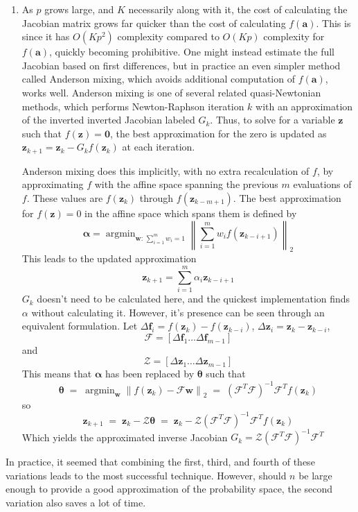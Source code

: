 \documentclass[11pt]{article}
\theoremstyle{definition}
\DeclareMathOperator*{\argmin}{arg\min}
\begin{document}
\begin{enumerate}
            \item As $p$ grows large, and $K$ necessarily along with it, the cost of calculating the Jacobian matrix grows far quicker than the cost of calculating $f(\mathbf a)$. This is since it has $O(Kp^2)$ complexity compared to $O(Kp)$ complexity for $f(\mathbf a)$, quickly becoming prohibitive. One might instead estimate the full Jacobian based on first differences, but in practice an even simpler method called Anderson mixing, which avoids additional computation of $f(\mathbf a)$, works well. Anderson mixing is one of several related quasi-Newtonian methods, which performs Newton-Raphson iteration $k$ with an approximation of the inverted inverted Jacobian labeled $G_k$. Thus, to solve for a variable $\mathbf z$ such that $f(\mathbf z)=\mathbf 0$, the best approximation for the zero is updated as $\mathbf z_{k+1}=\mathbf z_k - G_k f(\mathbf{z}_k)$ at each iteration. \par
    Anderson mixing does this implicitly, with no extra recalculation of $f$, by approximating $f$ with the affine space spanning the previous $m$ evaluations of $f$. These values are $f(\mathbf z_{k})$ through $f(\mathbf z_{k-m+1})$. The best approximation for $f(\mathbf z)=0$ in the affine space which spans them is defined by
    \[ \mathbf \alpha = \argmin_{\mathbf w:\, \sum_{i=1}^m w_i=1} \left\|\sum_{i=1}^m  w_i f(\mathbf z_{k-i+1}) \right\|_2 \]
    This leads to the updated approximation
    \[ \mathbf z_{k+1} = \sum_{i=1}^{m} \alpha_{i} \mathbf z_{k-i+1} \]
    $G_k$ doesn't need to be calculated here, and the quickest implementation finds $\alpha$ without calculating it. However, it's presence can be seen through an equivalent formulation. Let $\Delta \mathbf f_i = f(\mathbf z_k) - f(\mathbf z_{k-i})$, $\Delta \mathbf z_i = \mathbf z_k - \mathbf z_{k-i}$, 
    \[ \mathcal F = [\Delta \mathbf f_1 \ldots \Delta \mathbf f_{m-1}] \]
    and
    \[ \mathcal Z = [\Delta \mathbf z_1 \ldots \Delta \mathbf z_{m-1}] \]
    This means that $\mathbf\alpha$ has been replaced by $\mathbf\theta$ such that
    \[ \mathbf \theta \; = \;\argmin_{\mathbf w} \left\|f(\mathbf z_{k}) - \mathcal  F \mathbf w\right\|_2\; = \;(\mathcal F^T \mathcal F)^{-1}\mathcal F^Tf(\mathbf z_k) \]
    so 
    \[ \mathbf z_{k+1} \;= \;\mathbf z_{k} - \mathcal Z \mathbf \theta\; = \; \mathbf z_{k} - \mathcal Z(\mathcal F^T \mathcal F)^{-1}\mathcal F^T f(\mathbf z_k) \]
    Which yields the approximated inverse Jacobian $G_k= \mathcal Z(\mathcal F^T \mathcal F)^{-1}\mathcal F^T$
        \end{enumerate}
        In practice, it seemed that combining the first, third, and fourth of these variations leads to the most successful technique. However, should $n$ be large enough to provide a good approximation of the probability space, the second variation also saves a lot of time. 
\end{document}
